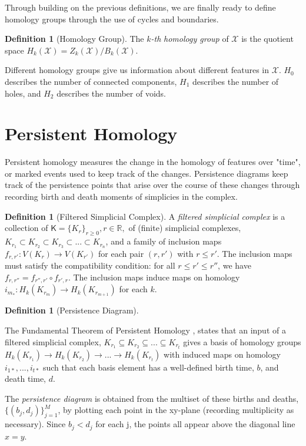 \documentclass[ma]{uncgdissertationexp}
\theoremstyle{plain}
\theoremstyle{definition}
\newtheorem{definition}[theorem]{Definition}
\theoremstyle{remark}
\begin{document}
\par Through building on the previous definitions, we are finally ready to define homology groups through the use of cycles and boundaries.

\begin{definition}[Homology Group]
\par The $k$\textit{-th} \textit{homology group} of $\mathcal{X}$ is the quotient space $H_k(\mathcal{X}) = Z_{k}(\mathcal{X})/B_{k}(\mathcal{X})$.
\end{definition}

\par Different homology groups give us information about different features in $\mathcal{X}$. $H_{0}$ describes the number of connected components, $H_{1}$ describes the number of holes, and $H_{2}$ describes the number of voids.
\newpage
\section{Persistent Homology}
\par Persistent homology measures the change in the homology of features over "time", or marked events used to keep track of the changes. Persistence diagrams keep track of the persistence points that arise over the course of these changes through recording birth and death moments of simplicies in the complex.

\begin{definition}[Filtered Simplicial Complex]
\par A \textit{filtered simplicial complex} is a collection of $\mathsf{K}=\{K_{r}\}_{r\geq 0}, r\in \mathbb{R},$ of (finite) simplicial complexes, $K_{r_{1}} \subset K_{r_{2}} \subset K_{r_{3}} \subset ... \subset K_{r_{n}}$, and a family of inclusion maps $f_{r, r'}: V(K_{r})\rightarrow V(K_{r'})$ for each pair $(r, r')$ with $r \leq r'$. The inclusion maps must satisfy the compatibility condition: for all $r\leq r'\leq r''$, we have $f_{r, r''} = f_{r'', r'} \circ {f_{r', r}}$. The inclusion maps induce maps on homology $i_{m_{*}}: H_{k}(K_{r_{m}})\rightarrow H_{k}(K_{r_{m+1}})$ for each $k$.
\end{definition}

\begin{definition}[Persistence Diagram]
\label{def:persdia}
\par The Fundamental Theorem of Persistent Homology \cite{computpershom}, states that an input of a filtered simplicial complex, $K_{r_{1}} \subseteq K_{r_{2}} \subseteq ... \subseteq K_{r_{t}}$ gives a basis of homology groups $H_{k}(K_{r_{1}}) \rightarrow H_{k}(K_{r_{2}}) \rightarrow ...\rightarrow H_{k}(K_{r_{t}})$ with induced maps on homology $i_{1*}, ..., i_{t*}$ such that each basis element has a well-defined birth time, $b$, and death time, $d$.
\par The \textit{persistence diagram} is obtained from the multiset of these births and deaths, $\{(b_{j},d_{j})\}^{M}_{j=1}$, by plotting each point in the xy-plane (recording multiplicity as necessary). Since $b_{j} < d_{j}$ for each j, the points all appear above the diagonal line $x=y$.
\end{definition}
\end{document}
